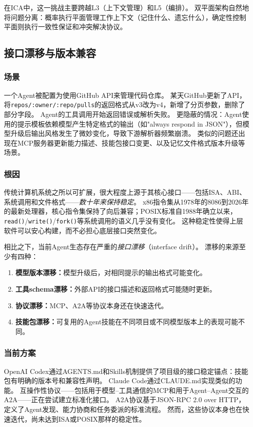 在ICA中，这一挑战主要跨越L3（上下文管理）和L5（编排）。
双平面架构自然地将问题分离：概率执行平面管理工作上下文（记住什么、遗忘什么），确定性控制平面则执行一致性保证和冲突解决协议。


\subsection{接口漂移与版本兼容}

\subsubsection{场景}
一个Agent被配置为使用GitHub API来管理代码仓库。
某天GitHub更新了API，将\texttt{repos/:owner/:repo/pulls}的返回格式从v3改为v4，新增了分页参数，删除了部分字段。
Agent的工具调用开始返回错误或解析失败。
更隐蔽的情况：Agent使用的提示模板依赖模型产生特定格式的输出（如"always respond in JSON"），但模型升级后输出风格发生了微妙变化，导致下游解析器频繁崩溃。
类似的问题还出现在MCP服务器更新能力描述、技能包接口变更、以及记忆文件格式版本升级等场景。

\subsubsection{根因}
传统计算机系统之所以可扩展，很大程度上源于其核心接口——包括ISA、ABI、系统调用和文件格式——\emph{数十年来保持稳定}。
x86指令集从1978年的8086到2026年的最新处理器，核心指令集保持了向后兼容；POSIX标准自1988年确立以来，\texttt{read()}/\texttt{write()}/\texttt{fork()}等系统调用的语义几乎没有变化\cite{ostep_2023}。
这种稳定性使得上层软件可以安心构建，而不必担心底层接口突然变化。

相比之下，当前Agent生态存在严重的\emph{接口漂移}（interface drift）。
漂移的来源至少有四种：
\begin{enumerate}[nosep]
\item \textbf{模型版本漂移：}模型升级后，对相同提示的输出格式可能变化。
\item \textbf{工具schema漂移：}外部API的接口描述和返回格式可能随时更新\cite{mcp_intro_2026}。
\item \textbf{协议漂移：}MCP、A2A等协议本身还在快速迭代\cite{agentprotocols2025,google_a2a_2025}。
\item \textbf{技能包漂移：}可复用的Agent技能在不同项目或不同模型版本上的表现可能不同。
\end{enumerate}

\subsubsection{当前方案}
OpenAI Codex通过AGENTS.md\cite{openai_codex_agents_md_2026}和Skills\cite{openai_codex_skills_2026}机制提供了项目级的接口稳定锚点：技能包有明确的版本号和兼容性声明。
Claude Code通过CLAUDE.md\cite{anthropic_claudecode_memory_2026}实现类似的功能。
互操作性协议——包括用于模型--工具通信的MCP\cite{mcp_intro_2026}和用于Agent--Agent交互的A2A\cite{google_a2a_2025}——正在尝试建立标准化接口。
A2A协议基于JSON-RPC 2.0 over HTTP，定义了Agent发现、能力协商和任务委派的标准流程\cite{google_a2a_2025}。
然而，这些协议本身也在快速迭代，尚未达到ISA或POSIX那样的稳定性。

